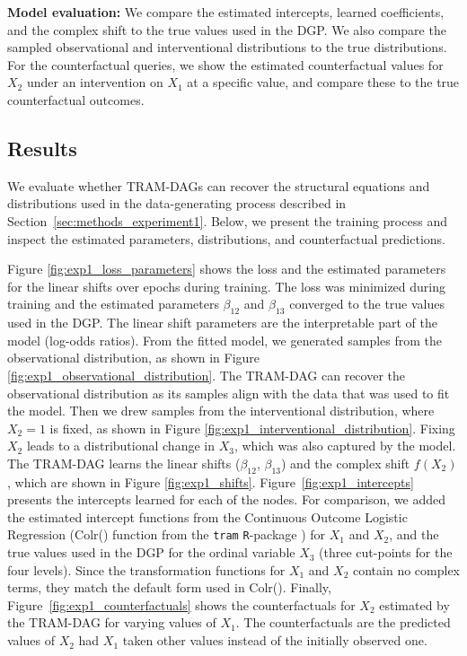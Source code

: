 \textbf{Model evaluation: } We compare the estimated intercepts, learned coefficients, and the complex shift to the true values used in the DGP. We also compare the sampled observational and interventional distributions to the true distributions. For the counterfactual queries, we show the estimated counterfactual values for $X_2$ under an intervention on $X_1$ at a specific value, and compare these to the true counterfactual outcomes.




\subsection{Results}



We evaluate whether TRAM-DAGs can recover the structural equations and distributions used in the data-generating process described in Section~\ref{sec:methods_experiment1}. Below, we present the training process and inspect the estimated parameters, distributions, and counterfactual predictions.

Figure \ref{fig:exp1_loss_parameters} shows the loss and the estimated parameters for the linear shifts over epochs during training. The loss was minimized during training and the estimated parameters $\beta_{12}$ and $\beta_{13}$ converged to the true values used in the DGP. The linear shift parameters are the interpretable part of the model (log-odds ratios). From the fitted model, we generated samples from the observational distribution, as shown in Figure \ref{fig:exp1_observational_distribution}. The TRAM-DAG can recover the observational distribution as its samples align with the data that was used to fit the model. Then we drew samples from the interventional distribution, where $X_2 = 1$ is fixed, as shown in Figure \ref{fig:exp1_interventional_distribution}. Fixing $X_2$ leads to a distributional change in $X_3$, which was also captured by the model. The TRAM-DAG learns the linear shifts ($\beta_{12}$, $\beta_{13}$) and the complex shift $f(X_2)$, which are shown in Figure \ref{fig:exp1_shifts}. Figure~\ref{fig:exp1_intercepts} presents the intercepts learned for each of the nodes. For comparison, we added the estimated intercept functions from the Continuous Outcome Logistic Regression (Colr() function from the \texttt{tram} \texttt{R}-package \citep{hothorn2018}) for $X_1$ and $X_2$, and the true values used in the DGP for the ordinal variable $X_3$ (three cut-points for the four levels). Since the transformation functions for $X_1$ and $X_2$ contain no complex terms, they match the default form used in Colr(). Finally, Figure~\ref{fig:exp1_counterfactuals} shows the counterfactuals for $X_2$ estimated by the TRAM-DAG for varying values of $X_1$. The counterfactuals are the predicted values of $X_2$ had $X_1$ taken other values instead of the initially observed one. 


